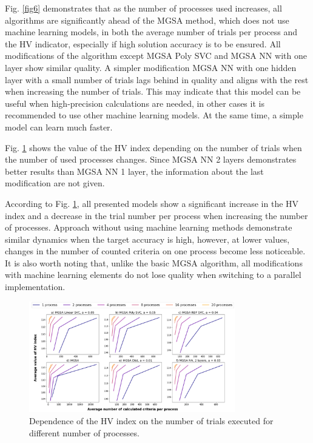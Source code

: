 \documentclass[runningheads]{llncs}
\begin{document}
Fig. \ref{fig6} demonstrates that as the number of processes used increases, all algorithms are significantly ahead of the MGSA method, which does not use machine learning models, in both the average number of trials per process and the HV indicator, especially if high solution accuracy is to be ensured. All modifications of the algorithm except MGSA Poly SVC and MGSA NN with one layer show similar quality. A simpler modification MGSA NN with one hidden layer with a small number of trials lags behind in quality and aligns with the rest when increasing the number of trials. This may indicate that this model can be useful when high-precision calculations are needed, in other cases it is recommended to use other machine learning models. At the same time, a simple model can learn much faster.

Fig. \ref{fig7} shows the value of the HV index depending on the number of trials when the number of used processes changes. Since MGSA NN 2 layers demonstrates better results than MGSA NN 1 layer, the information about the last modification are not given. 

According to Fig. \ref{fig7}, all presented models show a significant increase in the HV index and a decrease in the trial number per process when increasing the number of processes. Approach without using machine learning methods demonstrate similar dynamics when the target accuracy is high, however, at lower values, changes in the number of counted criteria on one process become less noticeable. It is also worth noting that, unlike the basic MGSA algorithm, all modifications with machine learning elements do not lose quality when switching to a parallel implementation.


\begin{figure}
\center
\includegraphics[width=0.8\textwidth]{fig7.png}
\caption{Dependence of the HV index on the number of trials executed for different number of processes.} \label{fig7}
\end{figure}
\end{document}
